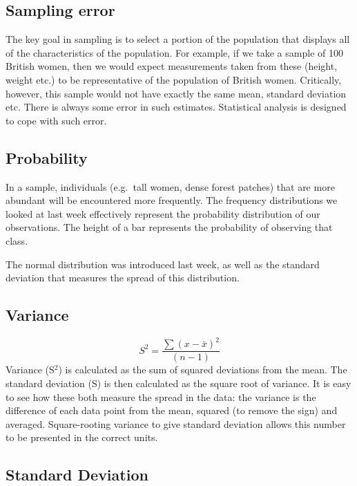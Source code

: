 \documentclass[
]{book}
\begin{document}
\subsection*{Sampling error}\label{sampling-error}

The key goal in sampling is to select a portion of the population that displays all of the characteristics of the population. For example, if we take a sample of 100 British women, then we would expect measurements taken from these (height, weight etc.) to be representative of the population of British women. Critically, however, this sample would not have exactly the same mean, standard deviation etc. There is always some error in such estimates. Statistical analysis is designed to cope with such error.

\subsection*{Probability}\label{probability}

In a sample, individuals (e.g.~tall women, dense forest patches) that are more abundant will be encountered more frequently. The frequency distributions we looked at last week effectively represent the probability distribution of our observations. The height of a bar represents the probability of observing that class.

The normal distribution was introduced last week, as well as the standard deviation that measures the spread of this distribution.

\subsection*{Variance}\label{variance}

\[
S^2 = \frac{\sum (x - \bar x)^2}{(n-1)}
\]
Variance (S\(^2\)) is calculated as the sum of squared deviations from the mean. The standard deviation (S) is then calculated as the square root of variance. It is easy to see how these both measure the spread in the data: the variance is the difference of each data point from the mean, squared (to remove the sign) and averaged. Square-rooting variance to give standard deviation allows this number to be presented in the correct units.

\subsection*{Standard Deviation}\label{standard-deviation}
\end{document}
